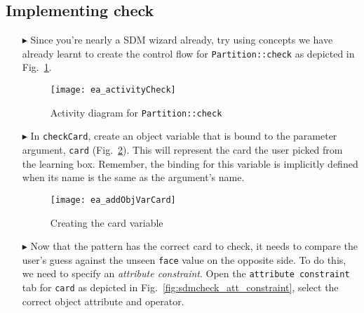 \newpage
\hypertarget{checkCard vis}{}
\subsection{Implementing check}
\visHeader

\begin{itemize}

\vspace{1cm}

\item[$\blacktriangleright$] Since you're nearly a SDM wizard already, try using concepts we have already learnt to create the control flow for
\texttt{Partition::check} as depicted in Fig.~\ref{fig:sdm_check_start}.

\vspace{1cm}

\begin{figure}[htbp]
\begin{center}
  \texttt{[image: ea\_activityCheck]}
  \caption{Activity diagram for \texttt{Partition::check}}
  \label{fig:sdm_check_start}
\end{center}
\end{figure}

\vspace{1cm}

\item[$\blacktriangleright$] In \texttt{checkCard}, create an object variable that is bound to the parameter argument, \texttt{card} 
(Fig.~\ref{fig:sdm_check_addCard}). This will represent the card the user picked from the learning box. Remember, the binding for this variable is implicitly
defined when its name is the same as the argument's name.

\begin{figure}[htbp]
\begin{center}
  \texttt{[image: ea\_addObjVarCard]}
  \caption{Creating the card variable}
  \label{fig:sdm_check_addCard}
\end{center}
\end{figure}

\clearpage

\item[$\blacktriangleright$] Now that the pattern has the correct card to check, it needs to compare the user's guess against the unseen \texttt{face} value on
the opposite side. To do this, we need to specify an \emph{attribute constraint}. Open the \texttt{attribute constraint} tab for \texttt{card} as depicted in
Fig.~\ref{fig:sdmcheck_att_constraint}, select the correct object attribute and operator.


\end{itemize}
